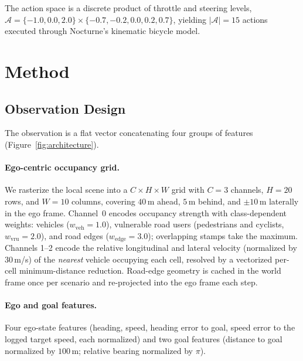 \documentclass{article}
\begin{document}
The action space is a discrete product of throttle and steering levels,
$\mathcal{A} = \{-1.0, 0.0, 2.0\} \times \{-0.7, -0.2, 0.0, 0.2, 0.7\}$,
yielding $|\mathcal{A}| = 15$ actions executed through Nocturne's kinematic
bicycle model.

\section{Method}
\label{sec:method}

\subsection{Observation Design}
\label{sec:observation}

The observation is a flat vector concatenating four groups of features
(Figure~\ref{fig:architecture}).

\paragraph{Ego-centric occupancy grid.}
We rasterize the local scene into a $C \times H \times W$ grid with $C = 3$
channels, $H = 20$ rows, and $W = 10$ columns, covering $40$\,m ahead,
$5$\,m behind, and $\pm 10$\,m laterally in the ego frame. Channel~0 encodes
occupancy strength with class-dependent weights: vehicles ($w_{\text{veh}} =
1.0$), vulnerable road users (pedestrians and cyclists, $w_{\text{vru}} =
2.0$), and road edges ($w_{\text{edge}} = 3.0$); overlapping stamps take the
maximum. Channels 1--2 encode the relative longitudinal and lateral velocity
(normalized by $30$\,m/s) of the \emph{nearest} vehicle occupying each cell,
resolved by a vectorized per-cell minimum-distance reduction. Road-edge
geometry is cached in the world frame once per scenario and re-projected
into the ego frame each step.

\paragraph{Ego and goal features.}
Four ego-state features (heading, speed, heading error to goal, speed error
to the logged target speed, each normalized) and two goal features (distance
to goal normalized by $100$\,m; relative bearing normalized by $\pi$).
\end{document}
